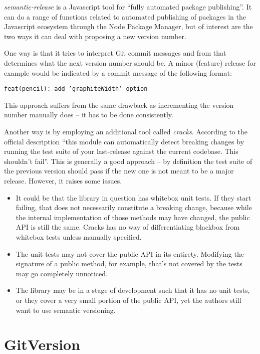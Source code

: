 \documentclass{l4proj}
\begin{document}
\textit{semantic-release}\cite{SemanticRelease} is a Javascript tool
for ``fully automated package publishing''. It can do a range of
functions related to automated publishing of packages in the
Javascript ecosystem through the Node Package Manager, but of interest
are the two ways it can deal with proposing a new version number.

One way is that it tries to interpret Git commit messages and from
that determines what the next version number should be. A minor
(feature) release for example would be indicated by a commit message
of the following format:

\begin{center}
\texttt{feat(pencil): add 'graphiteWidth' option}
\end{center}

This approach suffers from the same drawback as incrementing the
version number manually does -- it has to be done consistently.

Another way is by employing an additional tool called
\textit{cracks}\cite{Cracks}. According to the official description
``this module can automatically detect breaking changes by running the
test suite of your last-release against the current codebase. This
shouldn't fail''. This is generally a good approach -- by definition
the test suite of the previous version should pass if the new one is
not meant to be a major release. However, it raises some issues.

\begin{itemize}
\item It could be that the library in question has whitebox unit
tests. If they start failing, that does not necessarily constitute a
breaking change, because while the internal implementation of those
methods may have changed, the public API is still the same. Cracks has
no way of differentiating blackbox from whitebox tests unless manually
specified.
\item The unit tests may not cover the public API in its entirety.
Modifying the signature of a public method, for example, that's not
covered by the tests may go completely unnoticed.
\item The library may be in a stage of development such that it has no
unit tests, or they cover a very small portion of the public API, yet
the authors still want to use semantic versioning.
\end{itemize}

\section{GitVersion}
\end{document}
